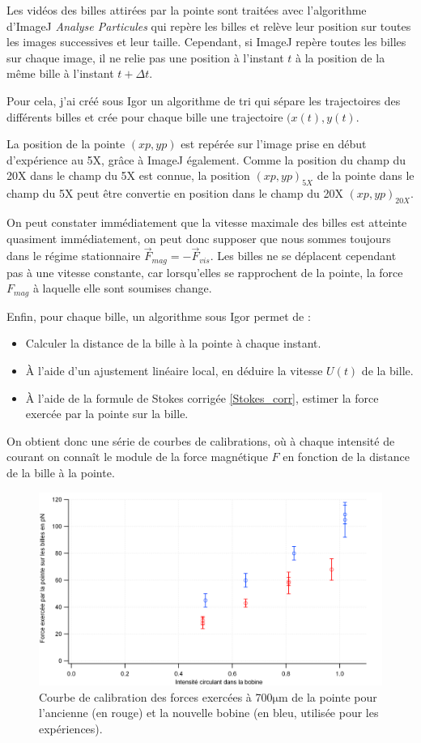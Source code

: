 \documentclass{report}
\newcommand{\micro}{$\mathrm{\mu}$}
\begin{document}
 Les vidéos des billes attirées par la pointe sont traitées avec l'algorithme d'ImageJ \emph{Analyse Particules} qui repère les billes et relève leur position sur toutes les images successives et leur taille. 
 Cependant, si ImageJ repère toutes les billes sur chaque image, il ne relie pas une position à l'instant $t$ à la position de la même bille à l'instant $t+ \Delta t$. 
 
 Pour cela, j'ai créé sous Igor un algorithme de tri qui sépare les trajectoires des différents billes et crée pour chaque bille une trajectoire $(x(t),y(t)$. 
 
 La position de la pointe $(xp,yp)$ est repérée sur l'image prise en début d'expérience au 5X, grâce à ImageJ également. Comme la position du champ du 20X dans le champ du 5X est connue, la position $(xp,yp)_{5X}$ de la pointe dans le champ du 5X peut être convertie en position dans le champ du 20X $(xp,yp)_{20X}$. 
 
 On peut constater immédiatement que la vitesse maximale des billes est atteinte quasiment immédiatement, on peut donc supposer que nous sommes toujours dans le régime stationnaire $\vec{F}_{mag}=-\vec{F}_{vis}$. 
 Les billes ne se déplacent cependant pas à une vitesse constante, car lorsqu'elles se rapprochent de la pointe, la force $F_{mag}$ à laquelle elle sont soumises change. 
 
 Enfin, pour chaque bille, un algorithme sous Igor permet de : 
 \begin{itemize}
 \item Calculer la distance de la bille à la pointe à chaque instant.
 \item \`A l'aide d'un ajustement linéaire local, en déduire la vitesse $U(t)$ de la bille.
 \item \`A l'aide de la formule de Stokes corrigée \ref{Stokes_corr}, estimer la force exercée par la pointe sur la bille.
 \end{itemize}
 
 On obtient donc une série de courbes de calibrations, où à chaque intensité de courant on connaît le module de la force magnétique $F$ en fonction de la distance de la bille à la pointe. 
 
 \begin{figure}
 \includegraphics[scale=0.5]{Calibration_resume.png}
 \caption{Courbe de calibration des forces exercées à 700\micro m de la pointe pour l'ancienne (en rouge) et la nouvelle bobine (en bleu, utilisée pour les expériences). }
 \end{figure}
	
\end{document}
